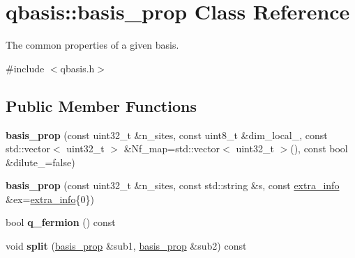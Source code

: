 \hypertarget{classqbasis_1_1basis__prop}{}\section{qbasis\+:\+:basis\+\_\+prop Class Reference}
\label{classqbasis_1_1basis__prop}


The common properties of a given basis.  




{\ttfamily \#include $<$qbasis.\+h$>$}

\subsection*{Public Member Functions}
\begin{DoxyCompactItemize}
\item 
\mbox{\label{classqbasis_1_1basis__prop_ae379653932a29af715f85f4ea63835ac}} 
{\bfseries basis\+\_\+prop} (const uint32\+\_\+t \&n\+\_\+sites, const uint8\+\_\+t \&dim\+\_\+local\+\_\+, const std\+::vector$<$ uint32\+\_\+t $>$ \&Nf\+\_\+map=std\+::vector$<$ uint32\+\_\+t $>$(), const bool \&dilute\+\_\+=false)
\item 
\mbox{\label{classqbasis_1_1basis__prop_a3b66fbefd43c4c102d6718b165ab0dbb}} 
{\bfseries basis\+\_\+prop} (const uint32\+\_\+t \&n\+\_\+sites, const std\+::string \&s, const \hyperlink{structqbasis_1_1extra__info}{extra\+\_\+info} \&ex=\hyperlink{structqbasis_1_1extra__info}{extra\+\_\+info}\{0\})
\item 
\mbox{\label{classqbasis_1_1basis__prop_a9e057c0b9c23775180912f39ed3a7870}} 
bool {\bfseries q\+\_\+fermion} () const
\item 
\mbox{\label{classqbasis_1_1basis__prop_a2a1988a27b10d9c69e6b9bddfa9ce8f6}} 
void {\bfseries split} (\hyperlink{classqbasis_1_1basis__prop}{basis\+\_\+prop} \&sub1, \hyperlink{classqbasis_1_1basis__prop}{basis\+\_\+prop} \&sub2) const
\end{DoxyCompactItemize}
